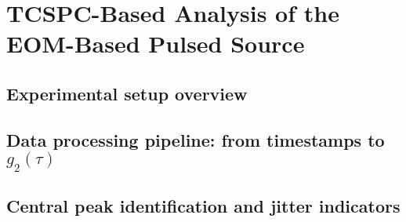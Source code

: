 \chapter{TCSPC-Based Analysis of the EOM-Based Pulsed Source}
\section{Experimental setup overview}
\section{Data processing pipeline: from timestamps to $g_{2}(\tau)$}
\section{Central peak identification and jitter indicators}
